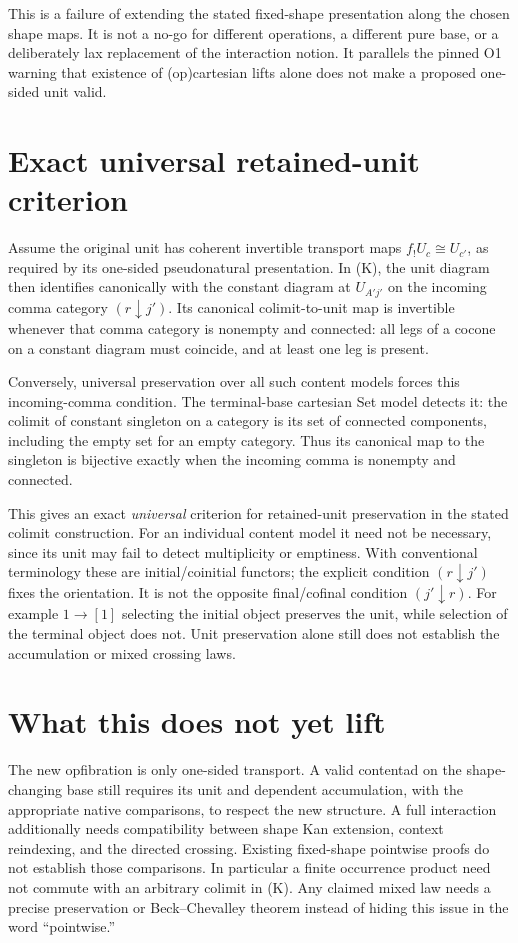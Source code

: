\documentclass[11pt]{article}
\begin{document}
This is a failure of extending the stated fixed-shape presentation along the chosen shape maps. It is not a no-go for different operations, a different pure base, or a deliberately lax replacement of the interaction notion. It parallels the pinned O1 warning that existence of (op)cartesian lifts alone does not make a proposed one-sided unit valid.

\section{Exact universal retained-unit criterion}
Assume the original unit has coherent invertible transport maps $f_!U_c\cong U_{c'}$, as required by its one-sided pseudonatural presentation. In (K), the unit diagram then identifies canonically with the constant diagram at $U_{A'j'}$ on the incoming comma category $(r\downarrow j')$. Its canonical colimit-to-unit map is invertible whenever that comma category is nonempty and connected: all legs of a cocone on a constant diagram must coincide, and at least one leg is present.

Conversely, universal preservation over all such content models forces this incoming-comma condition. The terminal-base cartesian Set model detects it: the colimit of constant singleton on a category is its set of connected components, including the empty set for an empty category. Thus its canonical map to the singleton is bijective exactly when the incoming comma is nonempty and connected.

This gives an exact \emph{universal} criterion for retained-unit preservation in the stated colimit construction. For an individual content model it need not be necessary, since its unit may fail to detect multiplicity or emptiness. With conventional terminology these are initial/coinitial functors; the explicit condition $(r\downarrow j')$ fixes the orientation. It is not the opposite final/cofinal condition $(j'\downarrow r)$. For example $1\to[1]$ selecting the initial object preserves the unit, while selection of the terminal object does not. Unit preservation alone still does not establish the accumulation or mixed crossing laws.

\section{What this does not yet lift}
The new opfibration is only one-sided transport. A valid contentad on the shape-changing base still requires its unit and dependent accumulation, with the appropriate native comparisons, to respect the new structure. A full interaction additionally needs compatibility between shape Kan extension, context reindexing, and the directed crossing. Existing fixed-shape pointwise proofs do not establish those comparisons. In particular a finite occurrence product need not commute with an arbitrary colimit in (K). Any claimed mixed law needs a precise preservation or Beck--Chevalley theorem instead of hiding this issue in the word ``pointwise.''
\end{document}
